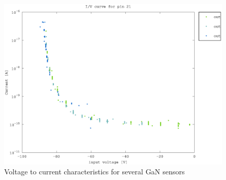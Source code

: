 \begin{figure}[h]
	    \centering
	    \includegraphics[width=\textwidth]{fig/pin21_slope.eps}
	    \caption[]%
	    {Voltage to current characteristics for several GaN sensors}    
	    \label{fig:pin22_30_slope}	
\end{figure}  

